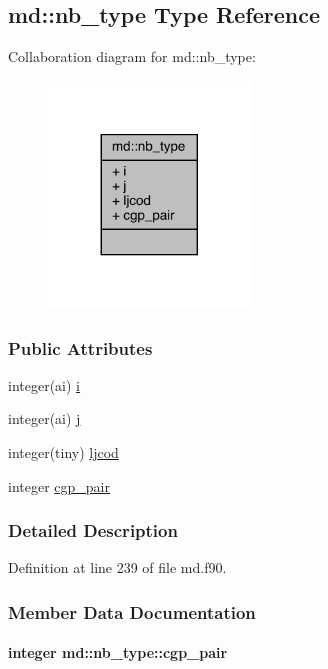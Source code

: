 \hypertarget{structmd_1_1nb__type}{\subsection{md\-:\-:nb\-\_\-type Type Reference}
\label{structmd_1_1nb__type}
}


Collaboration diagram for md\-:\-:nb\-\_\-type\-:
\nopagebreak
\begin{figure}[H]
\begin{center}
\leavevmode
\includegraphics[width=152pt]{structmd_1_1nb__type__coll__graph}
\end{center}
\end{figure}
\subsubsection*{Public Attributes}
\begin{DoxyCompactItemize}
\item 
integer(ai) \hyperlink{structmd_1_1nb__type_a90c49ae40c177027dac617f8137ab302}{i}
\item 
integer(ai) \hyperlink{structmd_1_1nb__type_ae67b72761c70d2a31c553e9713d9f079}{j}
\item 
integer(tiny) \hyperlink{structmd_1_1nb__type_a70d4fa1eb6610768fbbea89585db9901}{ljcod}
\item 
integer \hyperlink{structmd_1_1nb__type_abfcc0e5ed5c92929feebf9a489f34fb4}{cgp\-\_\-pair}
\end{DoxyCompactItemize}


\subsubsection{Detailed Description}


Definition at line 239 of file md.\-f90.



\subsubsection{Member Data Documentation}
\hypertarget{structmd_1_1nb__type_abfcc0e5ed5c92929feebf9a489f34fb4}{
\paragraph[{cgp\-\_\-pair}]{\setlength{\rightskip}{0pt plus 5cm}integer md\-::nb\-\_\-type\-::cgp\-\_\-pair}}\label{structmd_1_1nb__type_abfcc0e5ed5c92929feebf9a489f34fb4}


